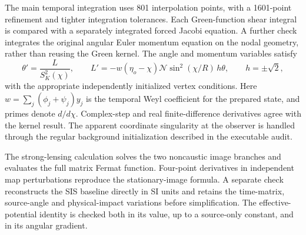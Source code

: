 \documentclass[11pt,a4paper]{article}
\begin{document}
The main temporal integration uses 801 interpolation points, with a
1601-point refinement and tighter integration tolerances. Each
Green-function shear integral is compared with a separately integrated
forced Jacobi equation. A further check integrates the original angular
Euler momentum equation on the nodal geometry, rather than reusing the
Green kernel. The angle and momentum variables satisfy
\begin{equation}
 \theta'=\frac{L}{S_K^2(\chi)},\qquad
 L'=-w(\eta_o-\chi)\mathcal N\sin^2(\chi/R)\,h\theta,
 \qquad h=\pm\sqrt2,
 \label{eq:independent-angular-ray}
\end{equation}
with the appropriate independently initialized vertex conditions.
Here $w=\sum_j(\phi_j+\psi_j)y_j$ is the temporal Weyl coefficient
for the prepared state, and primes denote $d/d\chi$.
Complex-step and real finite-difference derivatives agree with the
kernel result. The apparent coordinate singularity at the observer is
handled through the regular background initialization described in the
executable audit.

The strong-lensing calculation solves the two noncaustic image branches
and evaluates the full matrix Fermat function. Four-point derivatives
in independent map perturbations reproduce the stationary-image
formula. A separate check reconstructs the SIS baseline directly in
SI units and retains the time-matrix, source-angle and physical-impact
variations before simplification. The effective-potential identity is
checked both in its value, up to a source-only constant, and in its
angular gradient.
\end{document}
